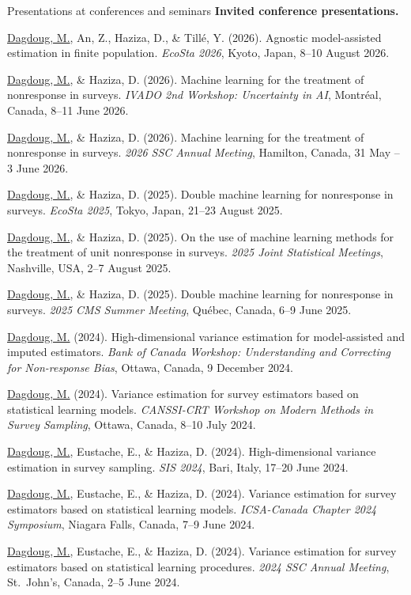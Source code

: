 \documentclass{resume}
\begin{document}
\begin{rSection}{Presentations at conferences and seminars}
\textbf{Invited conference presentations.}
\begin{etaremune}
  \item \underline{Dagdoug, M.}, An, Z., Haziza, D., \& Tillé, Y. (2026). Agnostic model-assisted estimation in finite population. \textit{EcoSta 2026}, Kyoto, Japan, 8--10 August 2026.
  \item \underline{Dagdoug, M.}, \& Haziza, D. (2026). Machine learning for the treatment of nonresponse in surveys. \textit{IVADO 2nd Workshop: Uncertainty in AI}, Montréal, Canada, 8--11 June 2026.
  \item \underline{Dagdoug, M.}, \& Haziza, D. (2026). Machine learning for the treatment of nonresponse in surveys. \textit{2026 SSC Annual Meeting}, Hamilton, Canada, 31 May -- 3 June 2026.
  \item \underline{Dagdoug, M.}, \& Haziza, D. (2025). Double machine learning for nonresponse in surveys. \textit{EcoSta 2025}, Tokyo, Japan, 21--23 August 2025.
  \item \underline{Dagdoug, M.}, \& Haziza, D. (2025). On the use of machine learning methods for the treatment of unit nonresponse in surveys. \textit{2025 Joint Statistical Meetings}, Nashville, USA, 2--7 August 2025.
  \item \underline{Dagdoug, M.}, \& Haziza, D. (2025). Double machine learning for nonresponse in surveys. \textit{2025 CMS Summer Meeting}, Québec, Canada, 6--9 June 2025.
  \item \underline{Dagdoug, M.} (2024). High-dimensional variance estimation for model-assisted and imputed estimators. \textit{Bank of Canada Workshop: Understanding and Correcting for Non-response Bias}, Ottawa, Canada, 9 December 2024.
  \item \underline{Dagdoug, M.} (2024). Variance estimation for survey estimators based on statistical learning models. \textit{CANSSI-CRT Workshop on Modern Methods in Survey Sampling}, Ottawa, Canada, 8--10 July 2024.
  \item \underline{Dagdoug, M.}, Eustache, E., \& Haziza, D. (2024). High-dimensional variance estimation in survey sampling. \textit{SIS 2024}, Bari, Italy, 17--20 June 2024.
  \item \underline{Dagdoug, M.}, Eustache, E., \& Haziza, D. (2024). Variance estimation for survey estimators based on statistical learning models. \textit{ICSA-Canada Chapter 2024 Symposium}, Niagara Falls, Canada, 7--9 June 2024.
  \item \underline{Dagdoug, M.}, Eustache, E., \& Haziza, D. (2024). Variance estimation for survey estimators based on statistical learning procedures. \textit{2024 SSC Annual Meeting}, St.\ John's, Canada, 2--5 June 2024.

\end{etaremune}
\end{rSection}
\end{document}
